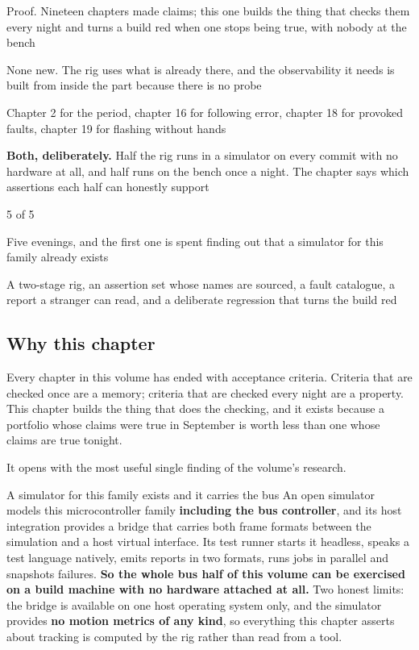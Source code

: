 
\begin{keyfacts}
\item[Adds to the node] Proof. Nineteen chapters made claims; this one builds the
thing that checks them every night and turns a build red when one stops being
true, with nobody at the bench
\item[Peripherals] None new. The rig uses what is already there, and the
observability it needs is built from inside the part because there is no probe
\item[Depends on] Chapter 2 for the period, chapter 16 for following error,
chapter 18 for provoked faults, chapter 19 for flashing without hands
\item[Real or modelled] \textbf{Both, deliberately.} Half the rig runs in a
simulator on every commit with no hardware at all, and half runs on the bench
once a night. The chapter says which assertions each half can honestly support
\item[Difficulty] 5 of 5
\item[Effort] Five evenings, and the first one is spent finding out that a
simulator for this family already exists
\item[Deliverable] A two-stage rig, an assertion set whose names are sourced, a
fault catalogue, a report a stranger can read, and a deliberate regression that
turns the build red
\end{keyfacts}

\subsection*{Why this chapter}

Every chapter in this volume has ended with acceptance criteria. Criteria that
are checked once are a memory; criteria that are checked every night are a
property. This chapter builds the thing that does the checking, and it exists
because a portfolio whose claims were true in September is worth less than one
whose claims are true tonight.

It opens with the most useful single finding of the volume's research.

\begin{note}{A simulator for this family exists and it carries the bus}
An open simulator models this microcontroller family \textbf{including the bus
controller}, and its host integration provides a bridge that carries both frame
formats between the simulation and a host virtual interface. Its test runner
starts it headless, speaks a test language natively, emits reports in two
formats, runs jobs in parallel and snapshots failures. \textbf{So the whole bus
half of this volume can be exercised on a build machine with no hardware
attached at all.} Two honest limits: the bridge is available on one host
operating system only, and the simulator provides \textbf{no motion metrics of
any kind}, so everything this chapter asserts about tracking is computed by the
rig rather than read from a tool.
\end{note}

